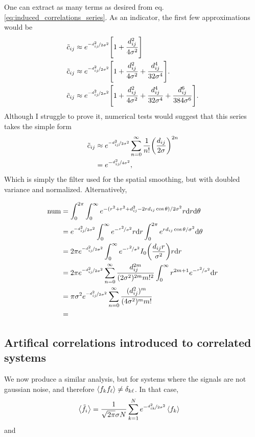 \documentclass{article}
\begin{document}
\begin{multicols}{2}
One can extract as many terms as desired from eq.\ref{eq:induced_correlations_series}. As an indicator, the first few approximations would be
\begin{align}
    \Tilde{c}_{ij} &\approx e^{\nicefrac{-d_{ij}^2}{2\sigma^2}}\qty[1+\frac{d_{ij}^2}{4\sigma^2}]\\
    \Tilde{c}_{ij} &\approx e^{\nicefrac{-d_{ij}^2}{2\sigma^2}}\qty[1+\frac{d_{ij}^2}{4\sigma^2} + \frac{d_{ij}^4}{32\sigma^4}].\\
    \Tilde{c}_{ij} &\approx  e^{\nicefrac{-d_{ij}^2}{2\sigma^2}}\qty[1+\frac{d_{ij}^2}{4\sigma^2} + \frac{d_{ij}^4}{32\sigma^4} + \frac{d_{ij}^6}{384\sigma^6}].
    \label{eq:series_approximations}
\end{align}
Although I struggle to prove it, numerical tests would suggest that this series takes the simple form
\begin{align*}
    \Tilde{c}_{ij} &\approx e^{\nicefrac{-d_{ij}^2}{2\sigma^2}}\sum_{n=0}^\infty \frac{1}{n!}\qty(\frac{d_{ij}}{2\sigma})^{2n}\\
    &= e^{-\nicefrac{d_{ij}^2}{4\sigma^2}},
\end{align*}
Which is simply the filter used for the spatial smoothing, but with doubled variance and normalized. Alternatively,

\begin{align*}
    \text{num} &= \int_{0}^{2\pi}\int_0^{\infty}e^{-(r^2+r^2+d_{ij}^2-2rd_{ij}\cos\theta)/2\sigma^2}r\dd r\dd \theta\\
    &= e^{\nicefrac{-d_{ij}^2}{2\sigma^2}}\int_0^{\infty}e^{-\nicefrac{r^2}{\sigma^2}}r\dd r\int_{0}^{2\pi}e^{rd_{ij}\cos\theta/\sigma^2}\dd \theta\\
    &= 2\pi e^{\nicefrac{-d_{ij}^2}{2\sigma^2}}\int_0^{\infty}e^{-\nicefrac{r^2}{\sigma^2}}I_0\qty(\frac{d_{ij}r}{\sigma^2})r\dd r\\
    &= 2\pi e^{\nicefrac{-d_{ij}^2}{2\sigma^2}} \sum_{n=0}^\infty \frac{d_{ij}^{2m}}{(2\sigma^2)^{2m} m!^2}\int_0^\infty r^{2m+1} e^{-\nicefrac{r^2}{\sigma^2}} \dd r\\
    &= \pi \sigma^2 e^{\nicefrac{-d_{ij}^2}{2\sigma^2}} \sum_{n=0}^\infty \frac{(d_{ij}^{2})^{m}}{(4\sigma^2)^{m} m!}\\
    &= 
\end{align*}

\raggedright

\subsection*{Artifical correlations introduced to correlated systems}
We now produce a similar analysis, but for systems where the signals are not gaussian noise, and therefore $\expval{f_kf_\ell} \neq \delta_{k\ell}$. In that case,
\begin{align*}
     \expval{\Tilde{f_i}} &= \frac{1}{\sqrt{2\pi}\sigma N}\sum_{k=1}^N e^{-\nicefrac{d_{ik}^2}{2\sigma^2}}\expval{f_k}
\end{align*}
and


\end{multicols}
\end{document}
